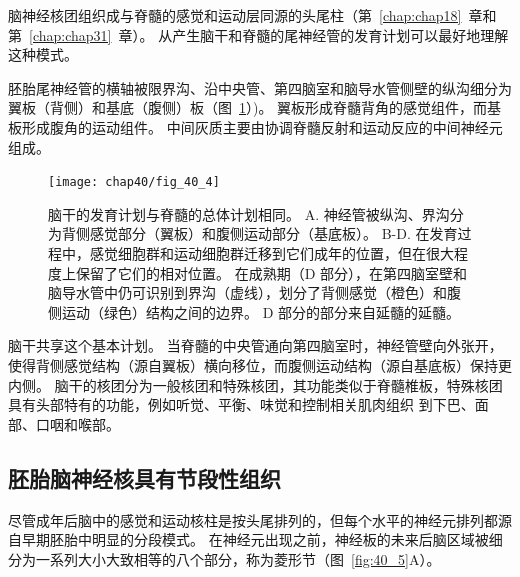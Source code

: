 脑神经核团组织成与脊髓的感觉和运动层同源的头尾柱（第~\ref{chap:chap18}~章和第~\ref{chap:chap31}~章）。
从产生脑干和脊髓的尾神经管的发育计划可以最好地理解这种模式。


胚胎尾神经管的横轴被限界沟、沿中央管、第四脑室和脑导水管侧壁的纵沟细分为翼板（背侧）和基底（腹侧）板（图~\ref{fig:40_4}）)。
翼板形成脊髓背角的感觉组件，而基板形成腹角的运动组件。
中间灰质主要由协调脊髓反射和运动反应的中间神经元组成。


\begin{figure}[htbp]
	\centering
	\texttt{[image: chap40/fig\_40\_4]}
	\caption{脑干的发育计划与脊髓的总体计划相同。
		A. 神经管被纵沟、界沟分为背侧感觉部分（翼板）和腹侧运动部分（基底板）。
		B-D. 在发育过程中，感觉细胞群和运动细胞群迁移到它们成年的位置，但在很大程度上保留了它们的相对位置。
		在成熟期（D 部分），在第四脑室壁和脑导水管中仍可识别到界沟（虚线），划分了背侧感觉（橙色）和腹侧运动（绿色）结构之间的边界。
		D 部分的部分来自延髓的延髓。}
	\label{fig:40_4}
\end{figure}


脑干共享这个基本计划。
当脊髓的中央管通向第四脑室时，神经管壁向外张开，使得背侧感觉结构（源自翼板）横向移位，而腹侧运动结构（源自基底板）保持更内侧。
脑干的核团分为一般核团和特殊核团，其功能类似于脊髓椎板，特殊核团具有头部特有的功能，例如听觉、平衡、味觉和控制相关肌肉组织 到下巴、面部、口咽和喉部。



\subsection{胚胎脑神经核具有节段性组织}

尽管成年后脑中的感觉和运动核柱是按头尾排列的，但每个水平的神经元排列都源自早期胚胎中明显的分段模式。 
在神经元出现之前，神经板的未来后脑区域被细分为一系列大小大致相等的八个部分，称为菱形节（图~\ref{fig:40_5}A）。


